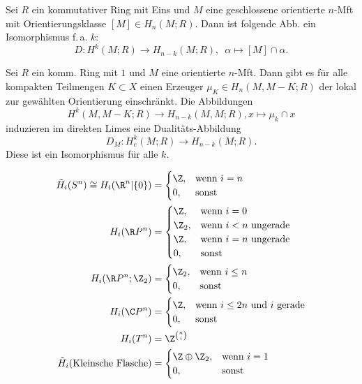 \documentclass{cheat-sheet}
\newcommand{\RH}{\tilde{H}} %
\newcommand{\ZM}[1]{\Z_{#1}} %
\begin{document}
\begin{satz}
  Sei $R$ ein kommutativer Ring mit Eins und $M$ eine geschlossene orientierte $n$-Mft mit Orientierungsklasse $[M] \in H_n(M; R)$. Dann ist folgende Abb. ein Isomorphismus f.\,a. $k$:
  \[ D : H^k(M; R) \to H_{n-k}(M; R), \enspace \alpha \mapsto [M] \cap \alpha. \]
\end{satz}

\begin{satz}
  Sei $R$ ein komm. Ring mit $1$ und $M$ eine orientierte $n$-Mft. Dann gibt es für alle kompakten Teilmengen $K \subset X$ einen Erzeuger $\mu_K \in H_n(M, M-K; R)$ der lokal zur gewählten Orientierung einschränkt. Die Abbildungen
  \[ H^k(M, M - K; R) \to H_{n-k}(M, M; R), x \mapsto \mu_k \cap x \]
  induzieren im direkten Limes eine Dualitäts-Abbildung
  \[ D_M : H^k_c(M; R) \to H_{n-k}(M; R). \]
  Diese ist ein Isomorphismus für alle $k$.
\end{satz}




\begin{bsp}
  \begin{align*}
    \RH_i(S^n) \cong H_i(\R^n|\{0\}) & = \begin{cases}
      \Z, & \text{wenn $i=n$} \\
      0, & \text{sonst}
    \end{cases} \\
    H_i(\R P^n) & = \begin{cases}
      \Z, & \text{wenn $i=0$} \\
      \ZM{2}, & \text{wenn $i < n$ ungerade} \\
      \Z, & \text{wenn $i=n$ ungerade} \\
      0, & \text{sonst}
    \end{cases} \\
    H_i(\R P^n; \ZM{2}) & = \begin{cases}
      \ZM{2}, & \text{wenn $i \leq n$} \\
      0, & \text{sonst}
    \end{cases} \\
    H_i(\C P^n) & = \begin{cases}
      \Z, & \text{wenn $i \leq 2n$ und $i$ gerade} \\
      0, & \text{sonst}
    \end{cases} \\
    H_i(T^n) & = \Z^{\binom{n}{i}} \\
    \RH_i(\text{Kleinsche Flasche}) & = \begin{cases}
      \Z \oplus \ZM{2}, & \text{wenn $i=1$} \\
      0, & \text{sonst}
    \end{cases}
  \end{align*}
\end{bsp}
\end{document}
